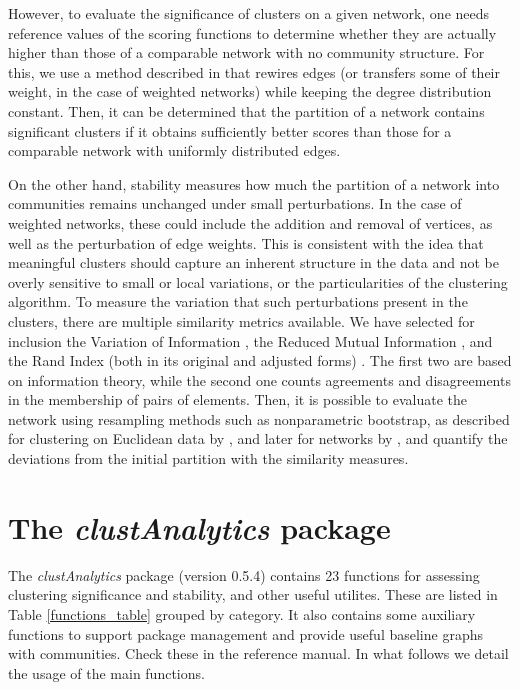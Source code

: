 However, to evaluate the significance of clusters on a given network, one needs reference values of the scoring functions to determine whether they are actually higher than those of a comparable network with no community structure. For this, we use a method described in \citep{arratia2021clustering} that rewires edges (or transfers some of their weight, in the case of weighted networks) while keeping the degree distribution constant. Then, it can be determined that the partition of a network contains significant clusters if it obtains sufficiently
better scores than those for a comparable network with uniformly distributed edges. 


On the other hand, stability measures how much the partition of a network into communities remains unchanged under small perturbations. In the case of weighted networks, these could include the addition and removal of vertices, as well as the perturbation of edge weights. This is consistent with the idea that meaningful clusters should capture an inherent structure in the data and not be overly sensitive to small or local variations, or the particularities of the clustering algorithm. To measure the variation that such perturbations present in the clusters, there are multiple similarity metrics available. We have selected for inclusion the Variation of Information \citep{varinformation}, the Reduced Mutual Information \citep{corrected_MI_Newman2020}, and the Rand Index (both in its original and adjusted forms) \citep{Hubert1985}. The first two are based on information theory, while the second one counts agreements and disagreements in the membership of pairs of elements. Then, it is possible to evaluate the network using resampling methods such as nonparametric bootstrap, as described for clustering on Euclidean data by \cite{Hennig2007}, and later for networks by \cite{arratia2021clustering}, and quantify the deviations from the initial partition with the similarity measures.



\section{The \textit{clustAnalytics} package} 

The  \textit{clustAnalytics} package (version 0.5.4) contains  23 functions for assessing  clustering significance and stability, and other useful utilites. These are listed in Table \ref{functions_table} grouped by category. It also contains some  auxiliary functions to support package management and provide useful baseline graphs with communities. Check these in the reference manual. In what follows we detail the usage of the main functions.


